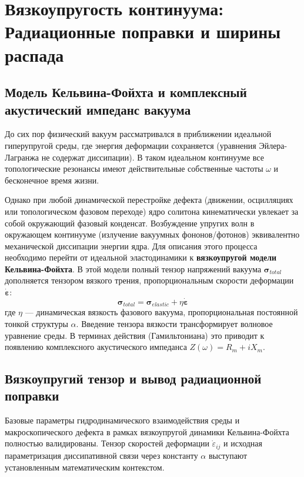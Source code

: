 \documentclass[12pt,a4paper]{article}
\begin{document}
	\section{Вязкоупругость континуума:\\ Радиационные поправки и ширины распада}
	
	\subsection{Модель Кельвина-Фойхта и комплексный акустический импеданс вакуума}
	До сих пор физический вакуум рассматривался в приближении идеальной гиперупругой среды, где энергия деформации сохраняется (уравнения Эйлера-Лагранжа не содержат диссипации). В таком идеальном континууме все топологические резонансы имеют действительные собственные частоты $\omega$ и бесконечное время жизни. 
	
	Однако при любой динамической перестройке дефекта (движении, осцилляциях или топологическом фазовом переходе) ядро солитона кинематически увлекает за собой окружающий фазовый конденсат. Возбуждение упругих волн в окружающем континууме (излучение вакуумных фононов/фотонов) эквивалентно механической диссипации энергии ядра. 
	Для описания этого процесса необходимо перейти от идеальной эластодинамики к \textbf{вязкоупругой модели Кельвина-Фойхта}. В этой модели полный тензор напряжений вакуума $\boldsymbol{\sigma}_{total}$ дополняется тензором вязкого трения, пропорциональным скорости деформации $\dot{\boldsymbol{\varepsilon}}$:
	\begin{equation}
		\boldsymbol{\sigma}_{total} = \boldsymbol{\sigma}_{elastic} + \eta \dot{\boldsymbol{\varepsilon}}
	\end{equation}
	где $\eta$ — динамическая вязкость фазового вакуума, пропорциональная постоянной тонкой структуры $\alpha$. 
	Введение тензора вязкости трансформирует волновое уравнение среды. В терминах действия (Гамильтониана) это приводит к появлению комплексного акустического импеданса $Z(\omega) = R_m + i X_m$. 
			
	\subsection{Вязкоупругий тензор и вывод радиационной поправки}
	
	Базовые параметры гидродинамического взаимодействия среды и макроскопического дефекта в рамках вязкоупругой динамики Кельвина-Фойхта полностью валидированы. Тензор скоростей деформации $\dot{\varepsilon}_{ij}$ и исходная параметризация диссипативной связи через константу $\alpha$ выступают установленным математическим контекстом. 
	
\end{document}
